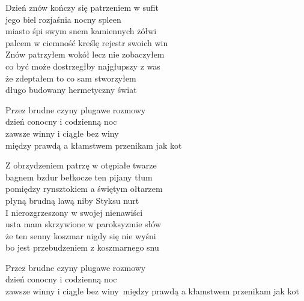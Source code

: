\begin{text}
    Dzień znów kończy się patrzeniem w sufit\\
    jego biel rozjaśnia nocny spleen\\
    miasto śpi swym snem kamiennych żółwi\\
    palcem w ciemność kreślę rejestr swoich win\\
    Znów patrzyłem wokół lecz nie zobaczyłem\\
    co być może dostrzegłby najgłupszy z was\\
    że zdeptałem to co sam stworzyłem\\
    długo budowany hermetyczny świat

    Przez brudne czyny plugawe rozmowy\\
    dzień conocny i codzienną noc\\
    zawsze winny i ciągle bez winy\\
    między prawdą a kłamstwem przenikam jak kot

    Z obrzydzeniem patrzę w otępiałe twarze\\
    bagnem bzdur bełkocze ten pijany tłum\\
    pomiędzy rynsztokiem a świętym ołtarzem\\
    płyną brudną lawą niby Styksu nurt\\
    I nierozgrzeszony w swojej nienawiści\\
    usta mam skrzywione w paroksyzmie słów\\
    że ten senny koszmar nigdy się nie wyśni\\
    bo jest przebudzeniem z koszmarnego snu

    Przez brudne czyny plugawe rozmowy\\
    dzień conocny i codzienną noc\\
    zawsze winny i ciągle bez winy\
    między prawdą a kłamstwem przenikam jak kot
\end{text}
\begin{chord}

\end{chord}
